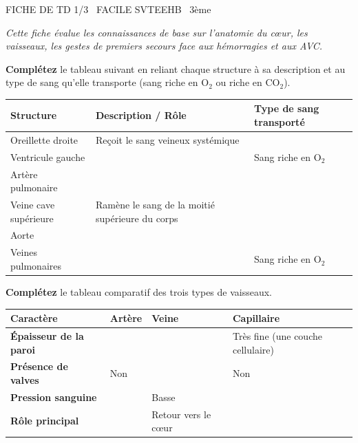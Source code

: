 \documentclass[11pt]{article}
\begin{document}
\begin{tcolorbox}[enhanced,colback=popink,colframe=popink,arc=10pt,boxrule=0pt,left=12pt,right=12pt,top=9pt,bottom=9pt]
{\color{white}\popxbold\small FICHE DE TD 1/3 \textbullet\ FACILE \hfill SVTEEHB \textbullet\ 3ème\par}
\end{tcolorbox}
\vspace{4pt}
\emph{Cette fiche évalue les connaissances de base sur l'anatomie du cœur, les vaisseaux, les gestes de premiers secours face aux hémorragies et aux AVC.}

\begin{exercice}
\textbf{Complétez} le tableau suivant en reliant chaque structure à sa description et au type de sang qu'elle transporte (sang riche en O$_2$ ou riche en CO$_2$).
\begin{tabularx}{\linewidth}{|X|X|X|}
\hline
\textbf{Structure} & \textbf{Description / Rôle} & \textbf{Type de sang transporté} \\
\hline
Oreillette droite & Reçoit le sang veineux systémique &  \\
\hline
Ventricule gauche &  & Sang riche en O$_2$ \\
\hline
Artère pulmonaire &  &  \\
\hline
Veine cave supérieure & Ramène le sang de la moitié supérieure du corps &  \\
\hline
Aorte &  &  \\
\hline
Veines pulmonaires &  & Sang riche en O$_2$ \\
\hline
\end{tabularx}
\end{exercice}

\begin{exercice}
\textbf{Complétez} le tableau comparatif des trois types de vaisseaux.
\begin{tabularx}{\linewidth}{|>{\bfseries}l|X|X|X|}
\hline
\textbf{Caractère} & \textbf{Artère} & \textbf{Veine} & \textbf{Capillaire} \\
\hline
Épaisseur de la paroi &  &  & Très fine (une couche cellulaire) \\
\hline
Présence de valves & Non &  & Non \\
\hline
Pression sanguine &  & Basse &  \\
\hline
Rôle principal &  & Retour vers le cœur &  \\
\hline
\end{tabularx}
\end{exercice}
\end{document}
